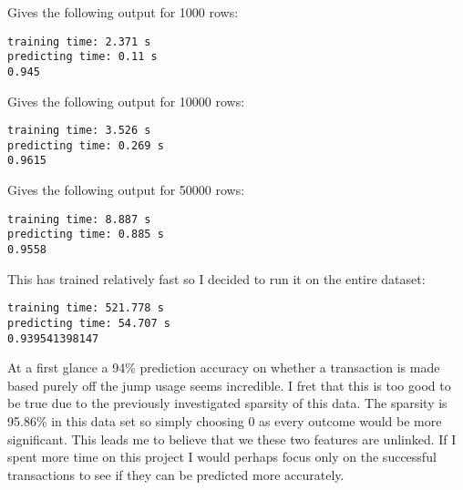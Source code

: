 \documentclass[a4paper]{report}
\begin{document}
Gives the following output for 1000 rows:
\begin{lstlisting}
training time: 2.371 s
predicting time: 0.11 s
0.945
\end{lstlisting}

Gives the following output for 10000 rows:
\begin{lstlisting}
training time: 3.526 s
predicting time: 0.269 s
0.9615
\end{lstlisting}

Gives the following output for 50000 rows:
\begin{lstlisting}
training time: 8.887 s
predicting time: 0.885 s
0.9558
\end{lstlisting}

This has trained relatively fast so I decided to run it on the entire dataset:
\begin{lstlisting}
training time: 521.778 s
predicting time: 54.707 s
0.939541398147
\end{lstlisting}

At a first glance a 94\% prediction accuracy on whether a transaction is made based purely off the jump usage seems incredible. I fret that this is too good to be true due to the previously investigated sparsity of this data. The sparsity is 95.86\% in this data set so simply choosing 0 as every outcome would be more significant. This leads me to believe that we these two features are unlinked. If I spent more time on this project I would perhaps focus only on the successful transactions to see if they can be predicted more accurately.
\end{document}
